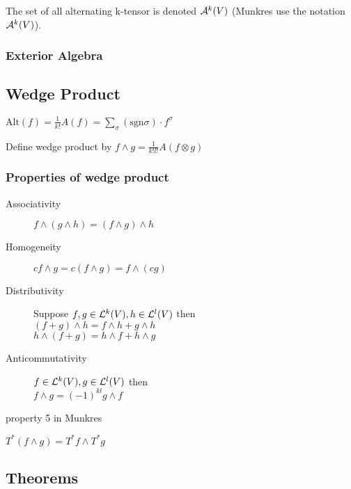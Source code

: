 The set of all alternating k-tensor is denoted ${\mathcal A}^k(V)$ (Munkres use the notation ${\mathcal A}^k(V)$).

\subsubsection{Exterior Algebra}
\TODO

\subsection{Wedge Product}
$\mathrm{Alt}(f)=\frac{1}{k!}A(f)=\sum_\sigma(\mathrm{sgn} \sigma)\cdot f^\sigma$


Define wedge product by $f\wedge g = \frac{1}{k!l!}A(f\otimes g)$

\subsubsection{Properties of wedge product}


\begin{description}
\item[Associativity] $f\wedge(g\wedge h)=(f\wedge g)\wedge h$
\item[Homogeneity] $cf\wedge g=c(f\wedge g)=f\wedge (cg)$
\item[Distributivity] Suppose $f,g\in {\mathcal L}^k(V), h\in {\mathcal L}^l(V)$ then\\
	$(f+g)\wedge h=f\wedge h+g\wedge h$\\
	$h\wedge (f+g)=h\wedge f+h\wedge g$
\item[Anticommutativity] $f\in {\mathcal L}^k(V), g\in {\mathcal L}^l(V)$ then\\
	$f \wedge g=(-1)^{kl}g \wedge f$
\item[property 5 in Munkres] \TODO
\end{description}

\TODO $T^*(f\wedge g)=T^*f\wedge T^*g$

\subsection{Theorems}
 \TODO
{} \TODO